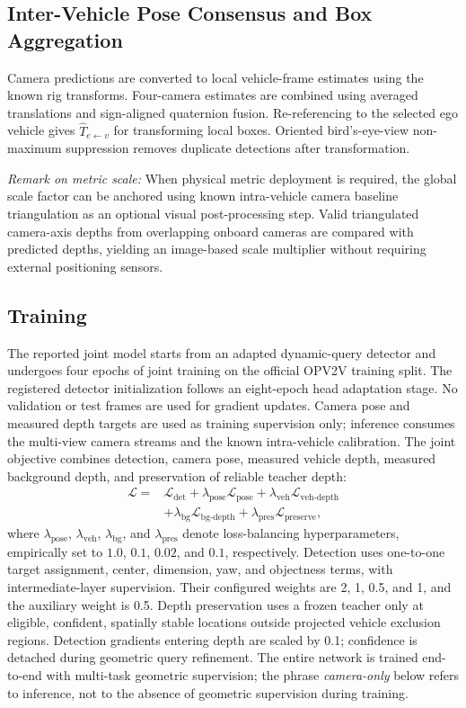 \subsection{Inter-Vehicle Pose Consensus and Box Aggregation}
Camera predictions are converted to local vehicle-frame estimates using the known rig transforms. Four-camera estimates are combined using averaged translations and sign-aligned quaternion fusion. Re-referencing to the selected ego vehicle gives $\hat T_{e\leftarrow v}$ for transforming local boxes. Oriented bird's-eye-view non-maximum suppression removes duplicate detections after transformation.

\textit{Remark on metric scale:} When physical metric deployment is required, the global scale factor can be anchored using known intra-vehicle camera baseline triangulation as an optional visual post-processing step. Valid triangulated camera-axis depths from overlapping onboard cameras are compared with predicted depths, yielding an image-based scale multiplier without requiring external positioning sensors.

\subsection{Training}
The reported joint model starts from an adapted dynamic-query detector and undergoes four epochs of joint training on the official OPV2V training split. The registered detector initialization follows an eight-epoch head adaptation stage. No validation or test frames are used for gradient updates. Camera pose and measured depth targets are used as training supervision only; inference consumes the multi-view camera streams and the known intra-vehicle calibration. The joint objective combines detection, camera pose, measured vehicle depth, measured background depth, and preservation of reliable teacher depth:
\begin{align}
\label{eq:joint_loss}
\mathcal{L} ={}& \mathcal{L}_{\mathrm{det}} + \lambda_{\mathrm{pose}}\mathcal{L}_{\mathrm{pose}} + \lambda_{\mathrm{veh}}\mathcal{L}_{\mathrm{veh\text{-}depth}} \nonumber\\
&+ \lambda_{\mathrm{bg}}\mathcal{L}_{\mathrm{bg\text{-}depth}} + \lambda_{\mathrm{pres}}\mathcal{L}_{\mathrm{preserve}},
\end{align}
where $\lambda_{\mathrm{pose}}$, $\lambda_{\mathrm{veh}}$, $\lambda_{\mathrm{bg}}$, and $\lambda_{\mathrm{pres}}$ denote loss-balancing hyperparameters, empirically set to $1.0$, $0.1$, $0.02$, and $0.1$, respectively. Detection uses one-to-one target assignment, center, dimension, yaw, and objectness terms, with intermediate-layer supervision. Their configured weights are 2, 1, 0.5, and 1, and the auxiliary weight is 0.5. Depth preservation uses a frozen teacher only at eligible, confident, spatially stable locations outside projected vehicle exclusion regions. Detection gradients entering depth are scaled by 0.1; confidence is detached during geometric query refinement. The entire network is trained end-to-end with multi-task geometric supervision; the phrase \emph{camera-only} below refers to inference, not to the absence of geometric supervision during training.

